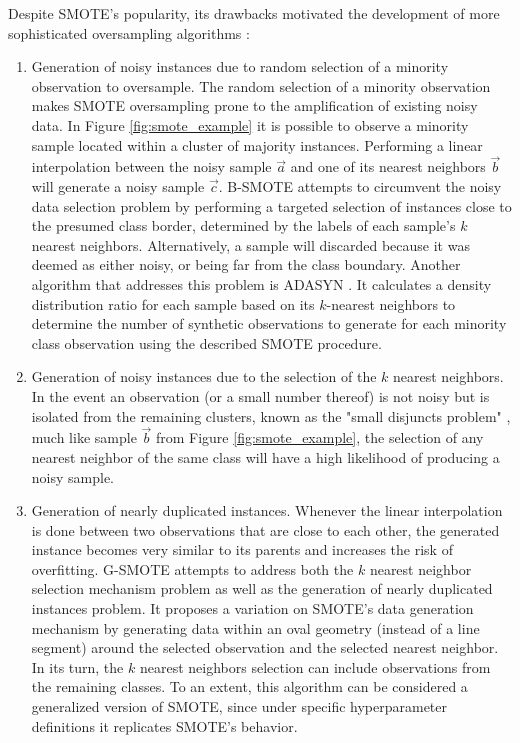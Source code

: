 \documentclass[parskip=full]{scrartcl}
\begin{document}
Despite SMOTE's popularity, its drawbacks motivated the development of more
sophisticated oversampling algorithms \cite{Douzas2019}:
\begin{enumerate}
	\item Generation of noisy instances due to random selection of a minority
	      observation to oversample. The random selection of a minority
	      observation makes SMOTE oversampling prone to the amplification of
	      existing noisy data. In Figure \ref{fig:smote_example} it is possible
	      to observe a minority sample located within a cluster of majority
	      instances. Performing a linear interpolation between the noisy sample
	      $\overrightarrow{a}$ and one of its nearest neighbors
	      $\overrightarrow{b}$ will generate a noisy sample
	      $\overrightarrow{c}$. B-SMOTE \cite{Han2005} attempts to circumvent
	      the noisy data selection problem by performing a targeted selection of
	      instances close to the presumed class border, determined by the labels
	      of each sample's $k$ nearest neighbors. Alternatively, a sample will
	      discarded because it was deemed as either noisy, or being far from the
	      class boundary. Another algorithm that addresses this problem is
	      ADASYN \cite{HaiboHe2008}. It calculates a density distribution ratio
	      for each sample based on its $k$-nearest neighbors to determine the
	      number of synthetic observations to generate for each minority class
	      observation using the described SMOTE procedure.

	\item Generation of noisy instances due to the selection of the $k$ nearest
	      neighbors. In the event an observation (or a small number thereof) is
	      not noisy but is isolated from the remaining clusters, known as the
	      "small disjuncts problem" \cite{holte1989}, much like sample
	      $\overrightarrow{b}$ from Figure \ref{fig:smote_example}, the
	      selection of any nearest neighbor of the same class will have a high
	      likelihood of producing a noisy sample.

	\item Generation of nearly duplicated instances. Whenever the linear
	      interpolation is done between two observations that are close to each
	      other, the generated instance becomes very similar to its parents and
	      increases the risk of overfitting. G-SMOTE \cite{Douzas2019} attempts
	      to address both the $k$ nearest neighbor selection mechanism problem
	      as well as the generation of nearly duplicated instances problem. It
	      proposes a variation on SMOTE's data generation mechanism by
	      generating data within an oval geometry (instead of a line segment)
	      around the selected observation and the selected nearest neighbor. In
	      its turn, the $k$ nearest neighbors selection can include observations
	      from the remaining classes. To an extent, this algorithm can be
	      considered a generalized version of SMOTE, since under specific
	      hyperparameter definitions it replicates SMOTE's behavior.


\end{enumerate}
\end{document}
